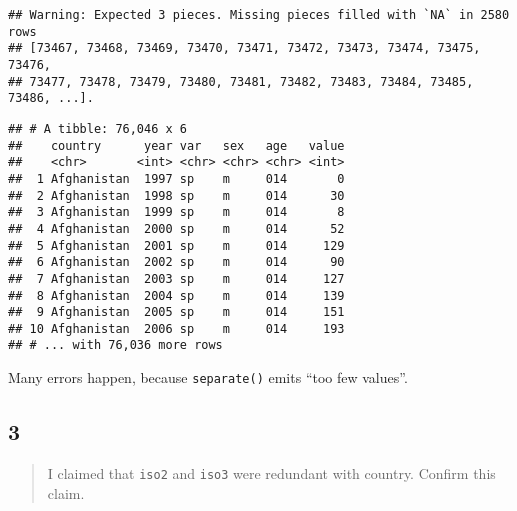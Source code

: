 \documentclass[]{ltjsarticle}
\newenvironment{Shaded}{\begin{snugshade}}{\end{snugshade}}
\newcommand{\DataTypeTok}[1]{\textcolor[rgb]{0.13,0.29,0.53}{#1}}
\newcommand{\DecValTok}[1]{\textcolor[rgb]{0.00,0.00,0.81}{#1}}
\newcommand{\KeywordTok}[1]{\textcolor[rgb]{0.13,0.29,0.53}{\textbf{#1}}}
\newcommand{\NormalTok}[1]{#1}
\newcommand{\OperatorTok}[1]{\textcolor[rgb]{0.81,0.36,0.00}{\textbf{#1}}}
\newcommand{\OtherTok}[1]{\textcolor[rgb]{0.56,0.35,0.01}{#1}}
\newcommand{\StringTok}[1]{\textcolor[rgb]{0.31,0.60,0.02}{#1}}
\begin{document}
\begin{Shaded}
\end{Shaded}

\begin{verbatim}
## Warning: Expected 3 pieces. Missing pieces filled with `NA` in 2580 rows
## [73467, 73468, 73469, 73470, 73471, 73472, 73473, 73474, 73475, 73476,
## 73477, 73478, 73479, 73480, 73481, 73482, 73483, 73484, 73485, 73486, ...].
\end{verbatim}

\begin{verbatim}
## # A tibble: 76,046 x 6
##    country      year var   sex   age   value
##    <chr>       <int> <chr> <chr> <chr> <int>
##  1 Afghanistan  1997 sp    m     014       0
##  2 Afghanistan  1998 sp    m     014      30
##  3 Afghanistan  1999 sp    m     014       8
##  4 Afghanistan  2000 sp    m     014      52
##  5 Afghanistan  2001 sp    m     014     129
##  6 Afghanistan  2002 sp    m     014      90
##  7 Afghanistan  2003 sp    m     014     127
##  8 Afghanistan  2004 sp    m     014     139
##  9 Afghanistan  2005 sp    m     014     151
## 10 Afghanistan  2006 sp    m     014     193
## # ... with 76,036 more rows
\end{verbatim}

Many errors happen, because \texttt{separate()} emits ``too few
values''.

\hypertarget{section-19}{%
\subsection{3}\label{section-19}}

\begin{quote}
I claimed that \texttt{iso2} and \texttt{iso3} were redundant with
country. Confirm this claim.
\end{quote}
\end{document}
